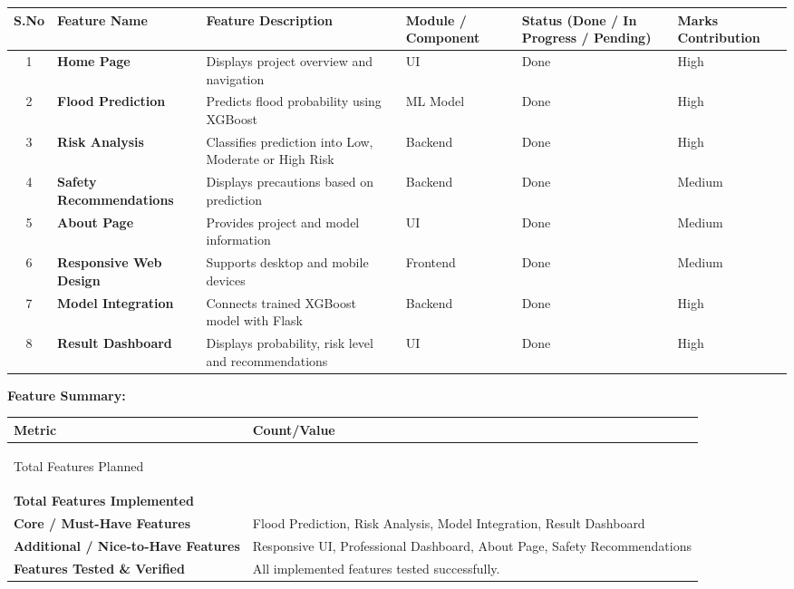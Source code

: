 \documentclass[11pt, a4paper]{article}
\begin{document}
\noindent
\begin{longtable}{|c|>{\bfseries}p{}|p{}|p{}|>{\centering\arraybackslash}p{}|>{\centering\arraybackslash}p{}|}
\hline
\textbf{S.No} & \textbf{Feature Name} & \textbf{Feature Description} & \textbf{Module / Component} & \textbf{Status \newline (Done / In Progress / Pending)} & \textbf{Marks Contribution} \\ \hline
\endfirsthead
\endhead %
\endfoot %
\endlastfoot

1 & Home Page & Displays project overview and navigation & UI & Done & High \\ \hline
2 & Flood Prediction & Predicts flood probability using XGBoost & ML Model & Done & High \\ \hline
3 & Risk Analysis & Classifies prediction into Low, Moderate or  High Risk & Backend & Done & High \\ \hline
4 & Safety Recommendations & Displays precautions based on prediction & Backend & Done & Medium \\ \hline
5 & About Page & Provides project and model information & UI & Done & Medium \\ \hline
6 & Responsive Web Design & Supports desktop and mobile devices & Frontend & Done & Medium \\ \hline
7 & Model Integration & Connects trained XGBoost model with Flask & Backend & Done & High \\ \hline
8 & Result Dashboard & Displays probability, risk level and recommendations & UI & Done & High \\ \hline
\end{longtable}

\vspace{1em}

\textbf{Feature Summary:}

\noindent
\begin{longtable}{|>{\bfseries}p{}|>{\centering\arraybackslash}p{}|}
\hline
\textbf{Metric} & \textbf{Count/Value} \\ \hline
\endfirsthead
\endhead
\endfoot
\endlastfoot

Total Features Planned & 8 \\ \hline
Total Features Implemented & 8 \\ \hline
Core / Must-Have Features & Flood Prediction, Risk Analysis, Model Integration, Result Dashboard \\ \hline
Additional / Nice-to-Have Features & Responsive UI, Professional Dashboard, About Page, Safety Recommendations \\ \hline
Features Tested \& Verified & All implemented features tested successfully. \\ \hline
\end{longtable}
\end{document}
